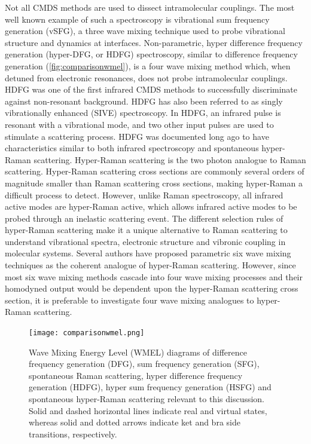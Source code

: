 \documentclass[aip, jcp, reprint, onecolumn]{revtex4-2}
\begin{document}
Not all CMDS methods are used to dissect intramolecular couplings.\cite{Shen1987_CPL}
The most well known example of such a spectroscopy is vibrational sum frequency generation (vSFG), a three wave mixing technique used to probe vibrational structure and dynamics at interfaces. \cite{Shen1987_CPL, RN224}
Non-parametric, hyper difference frequency generation (hyper-DFG, or HDFG) spectroscopy, similar to difference frequency generation (\autoref{fig:comparisonwmel}), is a four wave mixing method which, when detuned from  electronic resonances, does not probe intramolecular couplings. 
HDFG was one of the first infrared CMDS methods to successfully discriminate against non-resonant background.\cite{RN351, RN352}
HDFG has also been referred to as singly vibrationally enhanced (SIVE) spectroscopy. \cite{RN352}
In HDFG, an infrared pulse is resonant with a vibrational mode, and two other input pulses are used to stimulate a scattering process.
HDFG was documented long ago to have characteristics similar to both infrared spectroscopy and spontaneous hyper-Raman scattering. \cite{RN352}
Hyper-Raman scattering is the two photon analogue to Raman scattering. \cite{Terhune1965, Cyvin1965, Andrews1978}
Hyper-Raman scattering cross sections are commonly several orders of magnitude smaller than Raman scattering cross sections, making hyper-Raman a difficult process to detect.\cite{RN515, Kelley2010} 
However, unlike Raman spectroscopy, all infrared active modes are hyper-Raman active, which allows infrared active modes to be probed through an inelastic scattering event. \cite{Andrews1978}
The different selection rules of hyper-Raman scattering make it a unique alternative to Raman scattering to understand vibrational spectra, electronic structure and vibronic coupling in molecular systems. \cite{Olson2018}
Several authors have proposed parametric six wave mixing techniques as the coherent analogue of hyper-Raman scattering. \cite{Berger1978, Cho1997, Cho1998}
However, since most six wave mixing methods cascade into four wave mixing processes and their homodyned output would be dependent upon the hyper-Raman scattering cross section, \cite{RN243,Cho1997, Cho1998, Cho2000_Cascade} it is preferable to investigate four wave mixing analogues to hyper-Raman scattering.

\begin{figure}[!htbp]
	\centering
	\texttt{[image: comparisonwmel.png]}
	\caption{Wave Mixing Energy Level (WMEL) diagrams of difference frequency generation (DFG), sum frequency generation (SFG), spontaneous Raman scattering, hyper difference frequency generation (HDFG), hyper sum frequency generation (HSFG) and spontaneous hyper-Raman scattering relevant to this discussion. \cite{RN286}
	Solid and dashed horizontal lines indicate real and virtual states, whereas solid and dotted arrows indicate ket and bra side transitions, respectively. 
	}
	\label{fig:comparisonwmel}
\end{figure}
\end{document}
